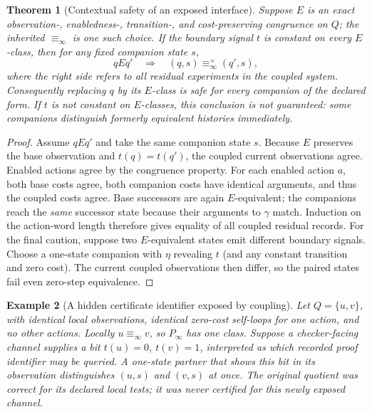 \documentclass[11pt,letterpaper]{article}
\newtheorem{theorem}{Theorem}[section]
\newtheorem{example}[theorem]{Example}
\newcommand{\eqinf}{\equiv_{\infty}}
\begin{document}
\begin{theorem}[Contextual safety of an exposed interface]\label{thm:context}
Suppose $E$ is an exact observation-, enabledness-, transition-, and cost-preserving congruence on $Q$; the inherited $\eqinf$ is one such choice. If the boundary signal $t$ is constant on every $E$-class, then for any fixed companion state $s$,
\[
 qE q'\quad\Longrightarrow\quad (q,s)\equiv^\times_{\infty}(q',s),
\]
where the right side refers to all residual experiments in the coupled system. Consequently replacing $q$ by its $E$-class is safe for \emph{every} companion of the declared form. If $t$ is not constant on $E$-classes, this conclusion is not guaranteed: some companions distinguish formerly equivalent histories immediately.
\end{theorem}
\begin{proof}
Assume $qE q'$ and take the same companion state $s$. Because $E$ preserves the base observation and $t(q)=t(q')$, the coupled current observations agree. Enabled actions agree by the congruence property. For each enabled action $a$, both base costs agree, both companion costs have identical arguments, and thus the coupled costs agree. Base successors are again $E$-equivalent; the companions reach the \emph{same} successor state because their arguments to $\gamma$ match. Induction on the action-word length therefore gives equality of all coupled residual records. For the final caution, suppose two $E$-equivalent states emit different boundary signals. Choose a one-state companion with $\eta$ revealing $t$ (and any constant transition and zero cost). The current coupled observations then differ, so the paired states fail even zero-step equivalence.
\end{proof}

\begin{example}[A hidden certificate identifier exposed by coupling]\label{ex:unsafe}
Let $Q=\{u,v\}$, with identical local observations, identical zero-cost self-loops for one action, and no other actions. Locally $u\eqinf v$, so $P_\infty$ has one class. Suppose a checker-facing channel supplies a bit $t(u)=0$, $t(v)=1$, interpreted as which recorded proof identifier may be queried. A one-state partner that shows this bit in its observation distinguishes $(u,s)$ and $(v,s)$ at once. The original quotient was correct for its declared \emph{local} tests; it was never certified for this newly exposed channel.
\end{example}
\end{document}
